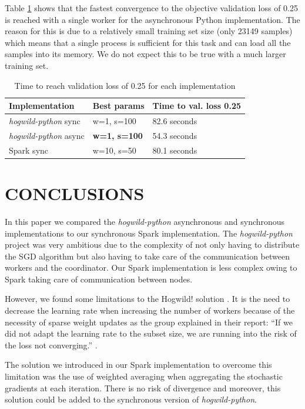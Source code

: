 \documentclass[a4paper, 11pt, conference]{ieeeconf}
\begin{document}
Table \ref{valloss} shows that the fastest convergence to the objective validation loss of 0.25 is reached with a single worker for the asynchronous Python implementation. The reason for this is due to a relatively small training set size (only 23149 samples) which means that a single process is sufficient for this task and can load all the samples into its memory. We do not expect this to be true with a much larger training set.


\begin{table}[ht]
\caption{Time to reach validation loss of 0.25 for each implementation}
\begin{tabular}{|l|l|l|}
\hline
Implementation & Best params & Time to val. loss 0.25 \\ \hline
\textit{hogwild-python}  sync & w=1, s=100 & 82.6 seconds \\ \hline
\textit{hogwild-python}  async & \textbf{w=1, s=100} & 54.3 seconds \\ \hline
Spark sync & w=10, s=50 & 80.1 seconds \\ \hline
\end{tabular}
\label{valloss}
\end{table}


\section{CONCLUSIONS}

In this paper we compared the \textit{hogwild-python} asynchronous and synchronous implementations to our synchronous Spark implementation. The \textit{hogwild-python} project was very ambitious due to the complexity of not only having to distribute the SGD algorithm but also having to take care of the communication between workers and the coordinator. Our Spark implementation is less complex owing to Spark taking care of communication between nodes.

However, we found some limitations to the Hogwild! solution \cite{hogwild-paper}. It is the need to decrease the learning rate when increasing the number of workers because of the necessity of sparse weight updates as the group explained in their report: ``If we did not adapt the learning rate to the subset size, we are running into the risk of the loss not converging.'' \cite[p. 4]{hogwild-python}.

The solution we introduced in our Spark implementation to overcome this limitation was the use of weighted averaging when aggregating the stochastic gradients at each iteration. There is no risk of divergence and moreover, this solution could be added to the synchronous version of \textit{hogwild-python}.
\end{document}
